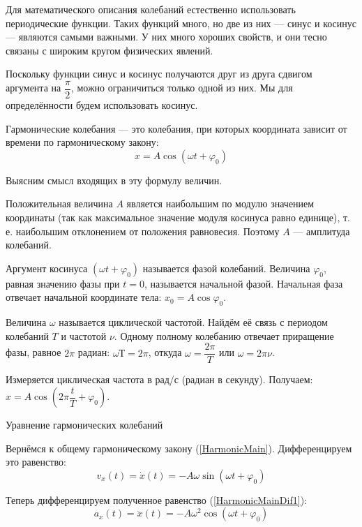 \documentclass[a4paper,12pt]{article} %
\begin{document}
Для математического описания колебаний естественно использовать
периодические функции. Таких функций много, но две из них — синус и косинус —
являются самыми важными. У них много хороших свойств, и они тесно связаны с
широким кругом физических явлений.

Поскольку функции синус и косинус получаются друг из друга сдвигом аргумента
на $\dfrac\pi2$, можно ограничиться только одной из них. Мы для определённости будем
использовать косинус.

Гармонические колебания — это колебания, при которых координата зависит от
времени по гармоническому закону:
\begin{equation} \label{HarmonicMain}
x = A\cos(\omega t + \varphi_0)
\end{equation}

Выясним смысл входящих в эту формулу величин.

Положительная величина $A$ является наибольшим по модулю значением
координаты (так как максимальное значение модуля косинуса равно единице), т. е.
наибольшим отклонением от положения равновесия. Поэтому $A$ — амплитуда
колебаний.

Аргумент косинуса $(\omega t + \varphi_0)$ называется фазой колебаний. Величина $\varphi_0$, равная
значению фазы при $t = 0$, называется начальной фазой. Начальная фаза отвечает
начальной координате тела: $x_0 = A \cos \varphi_0$.

Величина $\omega$ называется циклической частотой. Найдём её связь с периодом
колебаний $T$ и частотой $\nu$. Одному полному колебанию отвечает приращение фазы,
равное $2\pi$ радиан: $\omega Т = 2\pi$, откуда $\omega = \dfrac{2\pi}T$ или $\omega = 2\pi\nu$.

Измеряется циклическая частота в рад/с (радиан в секунду). Получаем:\\
$x = A \cos(2\pi \dfrac{t}{T} + \varphi_0)$.

\begin{center}
\large Уравнение гармонических колебаний
\end{center}

Вернёмся к общему гармоническому закону (\ref{HarmonicMain}). Дифференцируем это равенство:
\begin{equation} \label{HarmonicMainDif1}
v_x(t) = \dot x(t) = -A\omega\sin(\omega t + \varphi_0)
\end{equation}

Теперь дифференцируем полученное равенство (\ref{HarmonicMainDif1}):
\begin{equation} \label{HarmonicMainDif2}
a_x(t) = \ddot x(t) = -A\omega^2\cos(\omega t + \varphi_0)
\end{equation}
\end{document}
